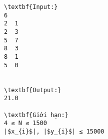 \begin{verbatim}
\textbf{Input:}
6
2  1
2  3
5  7
8  3
8  1
5  0


\textbf{Output:}
21.0

\textbf{Giới hạn:}
4 ≤ N ≤ 1500 
|$x_{i}$|, |$y_{i}$| ≤ 15000 
\end{verbatim}